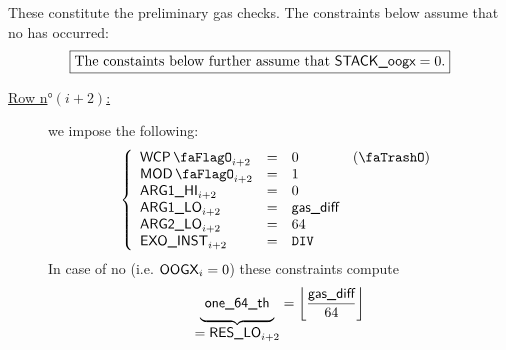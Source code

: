 These constitute the preliminary gas checks. The constraints below assume that no \oogxSH{} has occurred:
\[
	\boxed{\text{The constaints below further assume that } \textsf{STACK\_oogx} = 0.}
\]
\begin{description}
	\item[\underline{Row n$°(i + 2)$:}] we impose the following:
		\[
			\left\{\begin{array}{lclr}
				\wcpLookupFlag_{i + 2} & = & 0 & (\trash) \\
				\divLookupFlag_{i + 2} & = & 1 \\
				\argOneHi_{i + 2}      & = & 0 \\
				\argOneLo_{i + 2}      & = & \locDiff  \\
				\argTwoLo_{i + 2}      & = & 64 \\
				\exoInst_{i + 2}       & = & \inst{DIV} \\
			\end{array}\right.
		\]
		In case of no \oogxSH{} (i.e. $\textsf{OOGX}_{i} = 0$) these constraints compute
		\[
			\underbrace{\phantom{\Big|}\textsf{one\_64\_th}\phantom{\Big|}}_{\displaystyle = \textsf{RES}\textsf{\_LO}_{i + 2}}
			=
			\left\lfloor\frac{\textsf{gas\_diff}}{64}\right\rfloor
		\]
\end{description}

